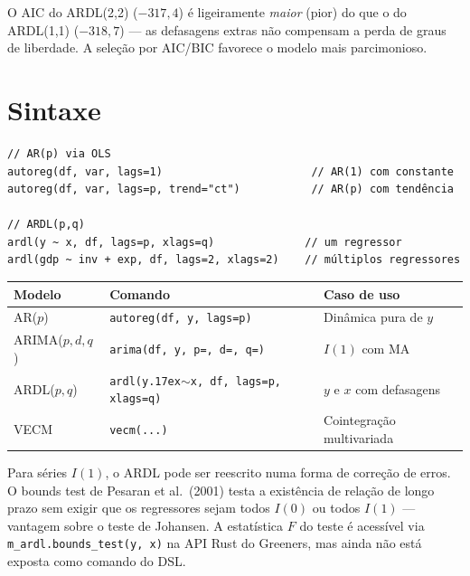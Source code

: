 O AIC do ARDL(2,2) ($-317{,}4$) é ligeiramente \emph{maior} (pior) do que o
do ARDL(1,1) ($-318{,}7$) — as defasagens extras não compensam a perda de
graus de liberdade. A seleção por AIC/BIC favorece o modelo mais parcimonioso.

\section{Sintaxe}

\begin{lstlisting}
// AR(p) via OLS
autoreg(df, var, lags=1)                       // AR(1) com constante
autoreg(df, var, lags=p, trend="ct")           // AR(p) com tendência

// ARDL(p,q)
ardl(y ~ x, df, lags=p, xlags=q)              // um regressor
ardl(gdp ~ inv + exp, df, lags=2, xlags=2)    // múltiplos regressores
\end{lstlisting}

\begin{center}
\begin{tabular}{lll}
\toprule
\textbf{Modelo} & \textbf{Comando} & \textbf{Caso de uso} \\
\midrule
AR($p$)      & \texttt{autoreg(df, y, lags=p)}       & Dinâmica pura de $y$ \\
ARIMA($p,d,q$) & \texttt{arima(df, y, p=, d=, q=)}  & $I(1)$ com MA \\
ARDL($p,q$)  & \texttt{ardl(y{\raise.17ex\hbox{$\scriptstyle\sim$}}x, df, lags=p, xlags=q)} & $y$ e $x$ com defasagens \\
VECM         & \texttt{vecm(...)}                     & Cointegração multivariada \\
\bottomrule
\end{tabular}
\end{center}

\begin{nota}
  Para séries $I(1)$, o ARDL pode ser reescrito numa forma de correção de
  erros. O bounds test de Pesaran et al.\ (2001) testa a existência de
  relação de longo prazo sem exigir que os regressores sejam todos $I(0)$
  ou todos $I(1)$ — vantagem sobre o teste de Johansen. A estatística
  $F$ do teste é acessível via \texttt{m\_ardl.bounds\_test(y, x)} na API
  Rust do Greeners, mas ainda não está exposta como comando do DSL.
\end{nota}
